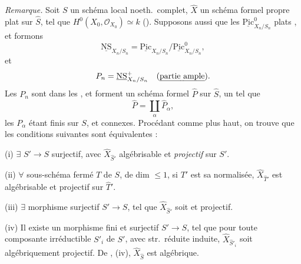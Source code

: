 \documentclass[11pt,a4paper]{article}
\begin{document}
\emph{Remarque.}  Soit $S$ 
un schéma local noeth.\ complet, $\hat{X}$ un schéma formel propre
 plat sur $\hat{S}$, tel que
$H^0(X_0, \mathcal{O}_{X_0}) \simeq k$ (). Supposons
aussi \struck{\ill{}} que  
les $\underline{\mathrm{Pic}}^0_{X_n/S_n}$  plats
, et formons
\[
  \underline{\mathrm{NS}}_{X_n/S_n} = \underline{\mathrm{Pic}}_{X_n/S_n} /
  \underline{\mathrm{Pic}}^0_{X_n/S_n} ,
\]
et 
\[
  P_n = \underline{\mathrm{NS}}^{+}_{X_n/S_n} \quad
  (\text{\uncertain{partie ample}}) .
\]
Les $P_n$ sont \struck{\ill{}}  dans les \ill{}, et
forment un schéma formel $\hat{P}$ sur $\hat{S}$, \ill{} 
un \ill{} tel que
\[
  \hat{P} = \coprod_{\alpha} \hat{P}_{\alpha} ,
\]
les $P_{\alpha}$ étant finis  sur $S$, et connexes. Procédant comme
plus haut, on trouve que les conditions suivantes sont
équivalentes :

(i) $\exists$ $S' \to S$ \struck{\ill{}}  surjectif,
\struck{\ill{}} avec $\hat{X}_{\hat{S}'}$ algébrisable et \emph{projectif}
sur $S'$.

(ii) $\forall$ sous-schéma fermé $T$ de $S$, de dim $\leqslant 1$, si $T'$
est sa normalisée, $\hat{X}_{\hat{T}'}$ est algébrisable et projectif sur
$\hat{T}'$.

(iii) $\exists$ morphisme  surjectif  $S' \to S$, tel que
$\hat{X}_{\hat{S}'}$ soit  et projectif.

(iv) Il existe un morphisme fini et surjectif $S' \to S$, tel que pour
toute composante irréductible $S'_i$ de $S'$, avec str.\ réduite induite,
$\hat{X}_{\hat{S}'_i}$ soit algébriquement projectif.
\struck{\ill{} \ill{} \ill{}} De , \struck{\ill{} \ill{}
\ill{}} (iv), $\hat{X}_{\hat{S}}$ est algébrique.



\end{document}
